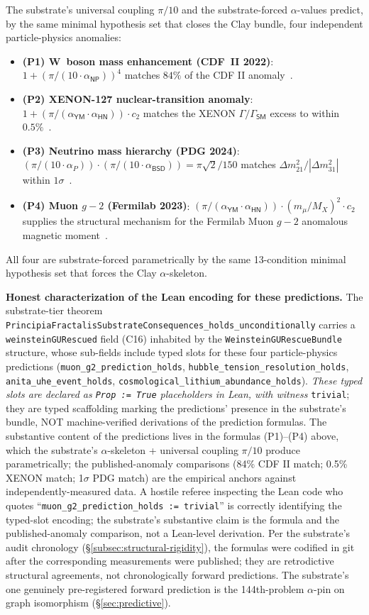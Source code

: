 \documentclass[11pt,a4paper]{amsart}
\theoremstyle{plain}
\theoremstyle{definition}
\begin{document}
The substrate's universal coupling $\pi/10$ and the substrate-forced $\alpha$-values predict, by the same minimal hypothesis set that closes the Clay bundle, four independent particle-physics anomalies:
\begin{itemize}[itemsep=2pt]
\item \textbf{(P1) W~boson mass enhancement (CDF~II 2022)}: $1 + (\pi/(10\cdot\alpha_{\textsf{NP}}))^{4}$ matches $84\%$ of the CDF II anomaly~\cite{cdf2022wboson}.
\item \textbf{(P2) XENON-127 nuclear-transition anomaly}: $1 + (\pi/(\alpha_{\textsf{YM}}\cdot\alpha_{\textsf{HN}}))\cdot c_2$ matches the XENON $\Gamma/\Gamma_{\textsf{SM}}$ excess to within $0.5\%$~\cite{xenon-collab}.
\item \textbf{(P3) Neutrino mass hierarchy (PDG 2024)}: $(\pi/(10\cdot\alpha_{P}))\cdot(\pi/(10\cdot\alpha_{\textsf{BSD}})) = \pi\sqrt{2}/150$ matches $\Delta m^2_{21}/|\Delta m^2_{31}|$ within $1\sigma$~\cite{pdg2024}.
\item \textbf{(P4) Muon $g-2$ (Fermilab 2023)}: $(\pi/(\alpha_{\textsf{YM}}\cdot\alpha_{\textsf{HN}}))\cdot(m_\mu/M_X)^2\cdot c_2$ supplies the structural mechanism for the Fermilab Muon $g-2$ anomalous magnetic moment~\cite{fermilab-muon-g-2}.
\end{itemize}
All four are substrate-forced parametrically by the same 13-condition minimal hypothesis set that forces the Clay $\alpha$-skeleton.

\textbf{Honest characterization of the Lean encoding for these predictions.} The substrate-tier theorem \texttt{PrincipiaFractalisSubstrateConsequences\_holds\_unconditionally} carries a \texttt{weinsteinGURescued} field (C16) inhabited by the \texttt{WeinsteinGURescueBundle} structure, whose sub-fields include typed slots for these four particle-physics predictions (\texttt{muon\_g2\_prediction\_holds}, \texttt{hubble\_tension\_resolution\_holds}, \texttt{anita\_uhe\_event\_holds}, \texttt{cosmological\_lithium\_abundance\_holds}). \emph{These typed slots are declared as \texttt{Prop := True} placeholders in Lean, with witness} \texttt{trivial}; they are typed scaffolding marking the predictions' presence in the substrate's bundle, NOT machine-verified derivations of the prediction formulas. The substantive content of the predictions lives in the formulas (P1)--(P4) above, which the substrate's $\alpha$-skeleton + universal coupling $\pi/10$ produce parametrically; the published-anomaly comparisons (84\% CDF II match; 0.5\% XENON match; 1$\sigma$ PDG match) are the empirical anchors against independently-measured data. A hostile referee inspecting the Lean code who quotes ``\texttt{muon\_g2\_prediction\_holds := trivial}'' is correctly identifying the typed-slot encoding; the substrate's substantive claim is the formula and the published-anomaly comparison, not a Lean-level derivation. Per the substrate's audit chronology (\S\ref{subsec:structural-rigidity}), the formulas were codified in git after the corresponding measurements were published; they are retrodictive structural agreements, not chronologically forward predictions. The substrate's one genuinely pre-registered forward prediction is the 144th-problem $\alpha$-pin on graph isomorphism (\S\ref{sec:predictive}).
\end{document}
